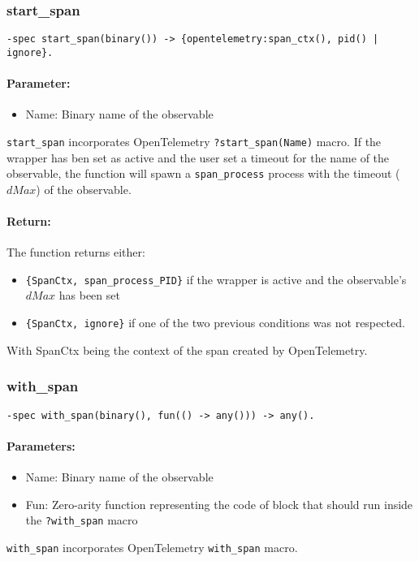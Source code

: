         \subsubsection{start\_span}
        \begin{verbatim}        
-spec start_span(binary()) -> {opentelemetry:span_ctx(), pid() | ignore}.
        \end{verbatim}
        \paragraph{Parameter:}
        \begin{itemize}
            \item Name: Binary name of the observable
        \end{itemize} 
        \texttt{start\_span} incorporates OpenTelemetry \texttt{?start\_span(Name)} macro. If the wrapper has ben set as active and the user set a timeout for the name of the observable, the function will spawn a \texttt{span\_process} process with the timeout ($dMax$) of the observable. \\
        \paragraph{Return:} 
        The function returns either:
        \begin{itemize}
            \item  \texttt{\{SpanCtx, span\_process\_PID\}} if the wrapper is active and the observable's $dMax$ has been set 
            \item \texttt{\{SpanCtx, ignore\}} if one of the two previous conditions was not respected.
        \end{itemize}
        With SpanCtx being the context of the span created by OpenTelemetry.
        \subsubsection{with\_span}
            \begin{verbatim}
-spec with_span(binary(), fun(() -> any())) -> any().
            \end{verbatim}
            \paragraph{Parameters:}
            \begin{itemize}
                \item Name: Binary name of the observable
                \item Fun: Zero-arity function representing the code of block that should run inside the \texttt{?with\_span} macro
            \end{itemize}
    \texttt{with\_span} incorporates OpenTelemetry \texttt{with\_span} macro. \\
